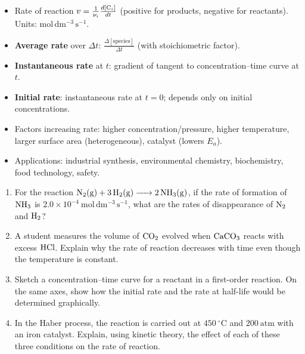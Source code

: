 \documentclass[11pt]{article}
\newcounter{popsec}
\newcounter{popsub}
\newcommand{\courssub}[1]{%
  \stepcounter{popsub}%
  \par\vspace{9pt}\noindent{\popxbold\fontsize{11.5}{13}\selectfont\color{popink}{\color{poporange}\thepopsec.\thepopsub}\hspace{6pt}#1}\par\nopagebreak\vspace{4pt}
}
\begin{document}
\courssub{Summary of Key Points}

\begin{aretenir}
\begin{itemize}
\item Rate of reaction $v = \frac{1}{\nu_i}\frac{d[\ce{C_i}]}{dt}$ (positive for products, negative for reactants). Units: $\mathrm{mol\,dm^{-3}\,s^{-1}}$.
\item \textbf{Average rate} over $\Delta t$: $\frac{\Delta[\text{species}]}{\Delta t}$ (with stoichiometric factor).
\item \textbf{Instantaneous rate} at $t$: gradient of tangent to concentration–time curve at $t$.
\item \textbf{Initial rate}: instantaneous rate at $t=0$; depends only on initial concentrations.
\item Factors increasing rate: higher concentration/pressure, higher temperature, larger surface area (heterogeneous), catalyst (lowers $E_a$).
\item Applications: industrial synthesis, environmental chemistry, biochemistry, food technology, safety.
\end{itemize}
\end{aretenir}

\begin{exercice}
\begin{enumerate}
\item For the reaction $\ce{N2(g) + 3H2(g) -> 2NH3(g)}$, if the rate of formation of $\ce{NH3}$ is $2.0 \times 10^{-4}\ \mathrm{mol\,dm^{-3}\,s^{-1}}$, what are the rates of disappearance of $\ce{N2}$ and $\ce{H2}$?
\item A student measures the volume of $\ce{CO2}$ evolved when $\ce{CaCO3}$ reacts with excess $\ce{HCl}$. Explain why the rate of reaction decreases with time even though the temperature is constant.
\item Sketch a concentration–time curve for a reactant in a first-order reaction. On the same axes, show how the initial rate and the rate at half-life would be determined graphically.
\item In the Haber process, the reaction is carried out at $450\ \mathrm{^\circ C}$ and $200\ \mathrm{atm}$ with an iron catalyst. Explain, using kinetic theory, the effect of each of these three conditions on the rate of reaction.
\end{enumerate}
\end{exercice}
\end{document}
